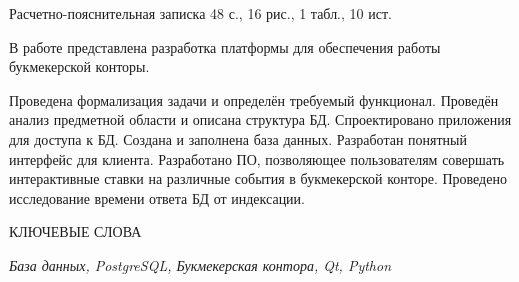 
Расчетно-пояснительная записка 48 с., 16 рис., 1 табл., 10 ист.

В работе представлена разработка платформы для обеспечения работы букмекерской конторы.

Проведена формализация задачи и определён требуемый функционал. Проведён анализ предметной области и описана структура БД. 
Спроектировано приложения для доступа к БД. Создана и заполнена база данных. Разработан понятный интерфейс для клиента. 
Разработано ПО, позволяющее пользователям совершать интерактивные ставки на различные события в букмекерской конторе.
Проведено исследование времени ответа БД от индексации.

КЛЮЧЕВЫЕ СЛОВА

\textit{База данных, PostgreSQL, Букмекерская контора, Qt, Python}

\pagebreak